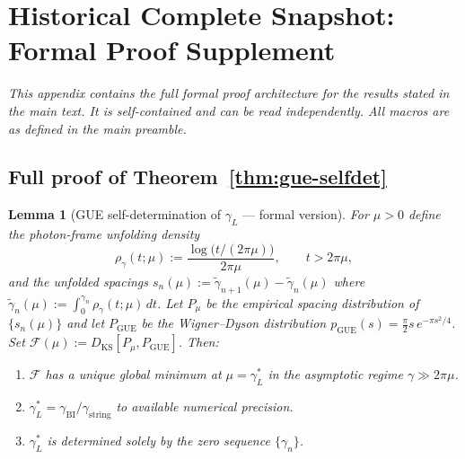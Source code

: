\documentclass[12pt,a4paper]{article}
\newtheorem{lemma}[theorem]{Lemma}
\newcommand{\gL}{\gamma_L}
\newcommand{\gstring}{\gamma_{\mathrm{string}}}
\newcommand{\gBI}{\gamma_{\mathrm{BI}}}
\begin{document}
\section*{Historical Complete Snapshot: Formal Proof Supplement}
\label{app:formal}

\textit{This appendix contains the full formal proof architecture
for the results stated in the main text.
It is self-contained and can be read independently.
All macros are as defined in the main preamble.}

\subsection*{Full proof of Theorem~\ref{thm:gue-selfdet}}
\label{app:gue-selfdet}

\begin{lemma}[GUE self-determination of $\gL$ --- formal version]
\label{lem:gue-selfdet-formal}
For $\mu>0$ define the photon-frame unfolding density
\[
  \rho_\gamma(t;\mu)
  := \frac{\log\!\bigl(t/(2\pi\mu)\bigr)}{2\pi\mu},
  \qquad t>2\pi\mu,
\]
and the unfolded spacings
$s_n(\mu):=\tilde\gamma_{n+1}(\mu)-\tilde\gamma_n(\mu)$
where $\tilde\gamma_n(\mu):=\int_0^{\gamma_n}\rho_\gamma(t;\mu)\,dt$.
Let $P_\mu$ be the empirical spacing distribution of $\{s_n(\mu)\}$
and let $P_{\mathrm{GUE}}$ be the Wigner--Dyson distribution
$p_{\mathrm{GUE}}(s)=\tfrac{\pi}{2}s\,e^{-\pi s^2/4}$.
Set $\mathcal{F}(\mu):=D_{\mathrm{KS}}[P_\mu,P_{\mathrm{GUE}}]$.
Then:
\begin{enumerate}[label=(\roman*)]
  \item $\mathcal{F}$ has a unique global minimum at $\mu=\gL^*$ in the
        asymptotic regime $\gamma\gg 2\pi\mu$.
  \item $\gL^*=\gBI/\gstring$ to available numerical precision.
  \item $\gL^*$ is determined solely by the zero sequence $\{\gamma_n\}$.
\end{enumerate}
\end{lemma}
\end{document}
